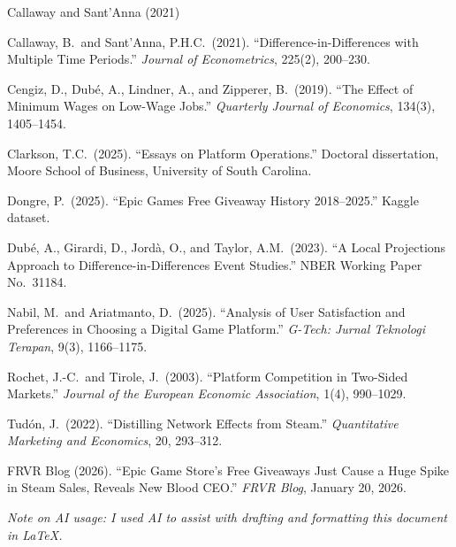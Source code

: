 \documentclass[11pt]{article}
\begin{document}
\begin{thebibliography}{Callaway and Sant'Anna (2021)}
\setlength{\itemsep}{0.5em}

Callaway, B.\ and Sant'Anna, P.H.C.\ (2021). ``Difference-in-Differences
with Multiple Time Periods.'' \textit{Journal of Econometrics}, 225(2),
200--230.

Cengiz, D., Dub\'{e}, A., Lindner, A., and Zipperer, B.\ (2019). ``The
Effect of Minimum Wages on Low-Wage Jobs.'' \textit{Quarterly Journal of
Economics}, 134(3), 1405--1454.

Clarkson, T.C.\ (2025). ``Essays on Platform Operations.'' Doctoral
dissertation, Moore School of Business, University of South Carolina.

Dongre, P.\ (2025). ``Epic Games Free Giveaway History 2018--2025.''
Kaggle dataset.

Dub\'{e}, A., Girardi, D., Jord\`{a}, O., and Taylor, A.M.\ (2023).
``A Local Projections Approach to Difference-in-Differences Event Studies.''
NBER Working Paper No.\ 31184.

Nabil, M.\ and Ariatmanto, D.\ (2025). ``Analysis of User Satisfaction and
Preferences in Choosing a Digital Game Platform.'' \textit{G-Tech: Jurnal
Teknologi Terapan}, 9(3), 1166--1175.

Rochet, J.-C.\ and Tirole, J.\ (2003). ``Platform Competition in Two-Sided
Markets.'' \textit{Journal of the European Economic Association}, 1(4),
990--1029.

Tud\'on, J.\ (2022). ``Distilling Network Effects from Steam.''
\textit{Quantitative Marketing and Economics}, 20, 293--312.

FRVR Blog (2026). ``Epic Game Store's Free Giveaways Just Cause a Huge
Spike in Steam Sales, Reveals New Blood CEO\@.'' \textit{FRVR Blog},
January 20, 2026.

\end{thebibliography}

\vspace{0.5em}
\noindent\textit{Note on AI usage: I used AI to assist with drafting and
formatting this document in \LaTeX.}
\end{document}
